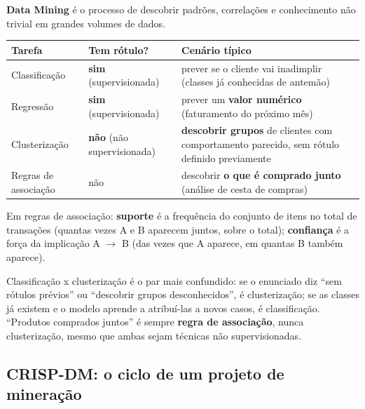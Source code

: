 \begin{conceito}
\textbf{Data Mining} é o processo de descobrir padrões, correlações e
conhecimento não trivial em grandes volumes de dados.

\begin{center}
\begin{tabular}{@{}p{3.2cm}p{3.2cm}p{4.4cm}@{}}
\toprule
\textbf{Tarefa} & \textbf{Tem rótulo?} & \textbf{Cenário típico} \\
\midrule
Classificação & \textbf{sim} (supervisionada) & prever se o cliente vai
inadimplir (classes já conhecidas de antemão) \\
Regressão & \textbf{sim} (supervisionada) & prever um \textbf{valor
numérico} (faturamento do próximo mês) \\
Clusterização & \textbf{não} (não supervisionada) & \textbf{descobrir
grupos} de clientes com comportamento parecido, sem rótulo definido
previamente \\
Regras de associação & não & descobrir \textbf{o que é comprado junto}
(análise de cesta de compras) \\
\bottomrule
\end{tabular}
\end{center}

Em regras de associação: \textbf{suporte} é a frequência do conjunto de
itens no total de transações (quantas vezes A e B aparecem juntos, sobre o
total); \textbf{confiança} é a força da implicação A $\to$ B (das vezes
que A aparece, em quantas B também aparece).
\end{conceito}

\begin{cuidado}
Classificação x clusterização é o par mais confundido: se o enunciado diz
“sem rótulos prévios” ou “descobrir grupos desconhecidos”, é
clusterização; se as classes já existem e o modelo aprende a atribuí-las
a novos casos, é classificação. “Produtos comprados juntos” é sempre
\textbf{regra de associação}, nunca clusterização, mesmo que ambas sejam
técnicas não supervisionadas.
\end{cuidado}

\subsection{CRISP-DM: o ciclo de um projeto de mineração}

